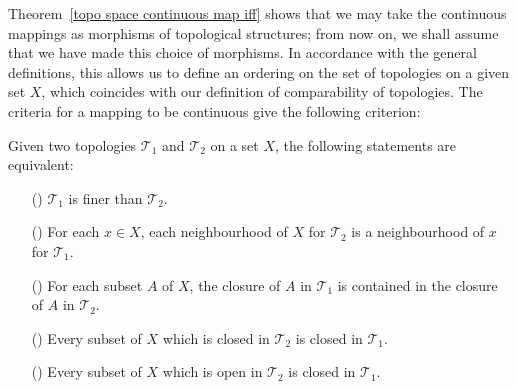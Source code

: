 Theorem~\ref{topo space continuous map iff} shows that we may take the continuous mappings as morphisms of topological structures; from now on, we shall assume that we have made this choice of morphisms. In accordance with the general definitions, this allows us to define an ordering on the set of topologies on a given set $X$, which coincides with our definition of comparability of topologies. The criteria for a mapping to be continuous give the following criterion:
\begin{proposition}\label{topo space finer topology iff}
Given two topologies $\mathcal{T}_1$ and $\mathcal{T}_2$ on a set $X$, the following statements are equivalent:
\begin{itemize}
\item[(\rmnum{1})] $\mathcal{T}_1$ is finer than $\mathcal{T}_2$.
\item[(\rmnum{2})] For each $x\in X$, each neighbourhood of $X$ for $\mathcal{T}_2$ is a neighbourhood of $x$ for $\mathcal{T}_1$.
\item[(\rmnum{3})] For each subset $A$ of $X$, the closure of $A$ in $\mathcal{T}_1$ is contained in the closure of $A$ in $\mathcal{T}_2$.
\item[(\rmnum{4})] Every subset of $X$ which is closed in $\mathcal{T}_2$ is closed in $\mathcal{T}_1$.
\item[(\rmnum{5})] Every subset of $X$ which is open in $\mathcal{T}_2$ is closed in $\mathcal{T}_1$.
\end{itemize}
\end{proposition}
